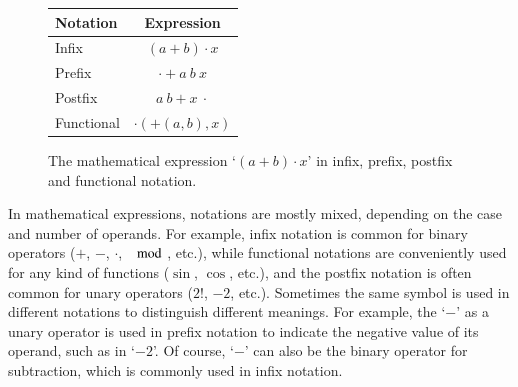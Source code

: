 \documentclass[a4paper,11pt]{article}
\theoremstyle{defTheoStyle}
\theoremstyle{defExampStyle}
\begin{document}
\begin{figure} %
\vspace{-5pt}
\begin{minipage}{0.38\textwidth}
\center
\begin{tabular}{lc}
\hline
Notation & Expression \\
\hline
Infix & $(a+b) \cdot x$\\
Prefix & $\cdot + a\ b\ x$\\
Postfix & $a\ b + x\ \cdot$\\
Functional & $\cdot(+(a, b), x)$\\
\hline
\end{tabular}
\caption{The mathematical expression `$(a+b) \cdot x$' in infix, prefix, postfix and functional notation.}
\label{tab:notations}
\end{minipage}
\vspace{3pt}
\end{figure}

In mathematical expressions, notations are mostly mixed, depending on the case and number of operands. For example, infix notation is common for binary operators ($+$, $-$, $\cdot$, $\mod$, etc.), while functional notations are conveniently used for any kind of functions ($\sin$, $\cos$, etc.), and the postfix notation is often common for unary operators ($2!$, $-2$, etc.). Sometimes the same symbol is used in different notations to distinguish different meanings. For example, the `$-$' as a unary operator is used in prefix notation to indicate the negative value of its operand, such as in `$-2$'. Of course, `$-$' can also be the binary operator for subtraction, which is commonly used in infix notation. 
\end{document}
